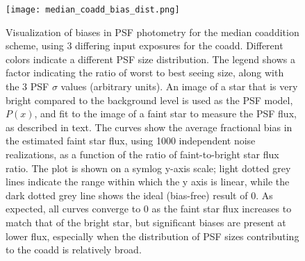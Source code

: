 \documentclass{aastex63}
\begin{document}
\begin{figure}
\begin{center}
    \texttt{[image: median\_coadd\_bias\_dist.png]}
    \caption{ Visualization of biases in PSF photometry for the median coaddition scheme, using 3 differing input exposures for the coadd.  Different colors indicate a different PSF size distribution. The legend shows a factor indicating the ratio of worst to best seeing size, along with the 3 PSF $\sigma$ values (arbitrary units). An image of a star that is very bright compared to the background level is used as the PSF model, $P(x)$,  and fit to the image of a faint star to measure the PSF flux, as described in text. The curves show the average fractional bias in the estimated faint star flux, using 1000 independent noise realizations, as a function of the ratio of faint-to-bright star flux ratio.  The plot is shown on a symlog y-axis scale; light dotted grey lines indicate the range within which the y axis is linear, while the dark dotted grey line shows the ideal (bias-free) result of 0.  As expected, all curves converge to 0 as the faint star flux increases to match that of the bright star, but significant biases are present at lower flux, especially when the distribution of PSF sizes contributing to the coadd is relatively broad.}
    \label{fig:Median Coadd Bias}
\end{center}
\end{figure}
\end{document}
